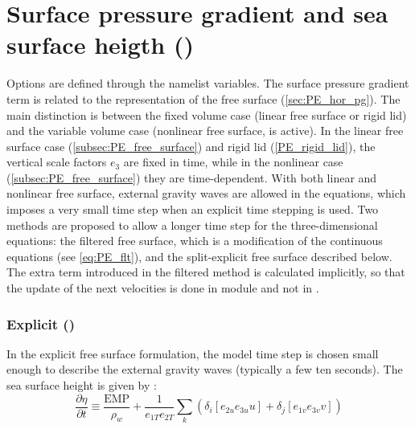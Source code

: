 \documentclass[../tex_main/NEMO_manual]{subfiles}
\begin{document}
\section{Surface pressure gradient and sea surface heigth (\protect{})}
\label{sec:DYN_hpg_spg}
Options are defined through the   namelist variables.
The surface pressure gradient term is related to the representation of the free surface (\autoref{sec:PE_hor_pg}). The main distinction is between the fixed volume case (linear free surface or rigid lid) and the variable volume case (nonlinear free surface,  is active). In the linear free surface case (\autoref{subsec:PE_free_surface}) and rigid lid (\autoref{PE_rigid_lid}), the vertical scale factors $e_{3}$ are fixed in time, while in the nonlinear case (\autoref{subsec:PE_free_surface}) they are time-dependent. With both linear and nonlinear free surface, external gravity waves are allowed in the equations, which imposes a very small time step when an explicit time stepping is used. Two methods are proposed to allow a longer time step for the three-dimensional equations: the filtered free surface, which is a modification of the continuous equations (see \autoref{eq:PE_flt}), and the split-explicit free surface described below. The extra term introduced in the filtered method is calculated implicitly, so that the update of the next velocities is done in module  and not in .

\subsubsection{Explicit (\protect{})}
\label{subsec:DYN_spg_exp}

In the explicit free surface formulation, the model time step is chosen small enough to describe the external gravity waves (typically a few ten seconds). The sea surface height is given by :
\begin{equation} \label{eq:dynspg_ssh}
\frac{\partial \eta }{\partial t}\equiv \frac{\text{EMP}}{\rho _w }+\frac{1}{e_{1T} 
e_{2T} }\sum\limits_k {\left( {\delta _i \left[ {e_{2u} e_{3u} u} 
\right]+\delta _j \left[ {e_{1v} e_{3v} v} \right]} \right)} 
\end{equation}
\end{document}
